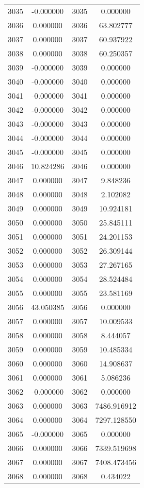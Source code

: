\documentclass[12pt]{article}
\begin{document}
\begin{longtable}{@{}cccc@{}}
3035 & -0.000000 & 3035 & 0.000000 \\
3036 & 0.000000 & 3036 & 63.802777 \\
3037 & 0.000000 & 3037 & 60.937922 \\
3038 & 0.000000 & 3038 & 60.250357 \\
3039 & -0.000000 & 3039 & 0.000000 \\
3040 & -0.000000 & 3040 & 0.000000 \\
3041 & -0.000000 & 3041 & 0.000000 \\
3042 & -0.000000 & 3042 & 0.000000 \\
3043 & -0.000000 & 3043 & 0.000000 \\
3044 & -0.000000 & 3044 & 0.000000 \\
3045 & -0.000000 & 3045 & 0.000000 \\
3046 & 10.824286 & 3046 & 0.000000 \\
3047 & 0.000000 & 3047 & 9.848236 \\
3048 & 0.000000 & 3048 & 2.102082 \\
3049 & 0.000000 & 3049 & 10.924181 \\
3050 & 0.000000 & 3050 & 25.845111 \\
3051 & 0.000000 & 3051 & 24.201153 \\
3052 & 0.000000 & 3052 & 26.309144 \\
3053 & 0.000000 & 3053 & 27.267165 \\
3054 & 0.000000 & 3054 & 28.524484 \\
3055 & 0.000000 & 3055 & 23.581169 \\
3056 & 43.050385 & 3056 & 0.000000 \\
3057 & 0.000000 & 3057 & 10.009533 \\
3058 & 0.000000 & 3058 & 8.444057 \\
3059 & 0.000000 & 3059 & 10.485334 \\
3060 & 0.000000 & 3060 & 14.908637 \\
3061 & 0.000000 & 3061 & 5.086236 \\
3062 & -0.000000 & 3062 & 0.000000 \\
3063 & 0.000000 & 3063 & 7486.916912 \\
3064 & 0.000000 & 3064 & 7297.128550 \\
3065 & -0.000000 & 3065 & 0.000000 \\
3066 & 0.000000 & 3066 & 7339.519698 \\
3067 & 0.000000 & 3067 & 7408.473456 \\
3068 & 0.000000 & 3068 & 0.434022 \\

\end{longtable}
\end{document}
